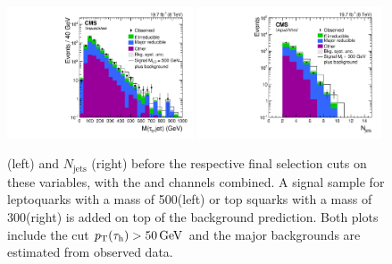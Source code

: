 \begin{figure}[hbt]
  \begin{center}
    \includegraphics[width=0.49\textwidth]{figures/final/mtj_lq_log.pdf}
    \includegraphics[width=0.49\textwidth]{figures/final/njets_lqd321_log.pdf}
    \caption{\MassTJ (left) and $N_{\text{jets}}$ (right) before the respective final selection cuts on these variables, with the \etau and \mutau channels combined. A signal sample for leptoquarks with a mass of 500\GeV (left) or top squarks with a mass of 300\GeV (right) is added on top of the background prediction. Both plots include the cut $p_{\mathrm{T}}(\tau_{\text{h}})>50\,\text{Ge\hspace{-.08em}V}$ and the major backgrounds are estimated from observed data.}
    \label{fig:finalcutscombined}
  \end{center}
\end{figure}